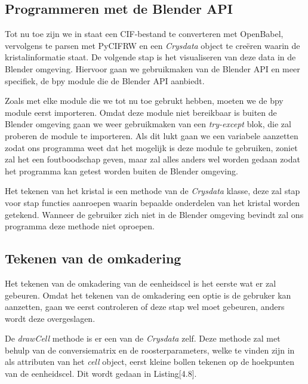 \subsection{Programmeren met de Blender API}
Tot nu toe zijn we in staat een CIF-bestand te converteren met OpenBabel, vervolgens te parsen met PyCIFRW en een \textit{Crysdata} object te creëren waarin de kristalinformatie staat. De volgende stap is het visualiseren van deze data in de Blender omgeving. Hiervoor gaan we gebruikmaken van de Blender API en meer specifiek, de bpy module die de Blender API aanbiedt. 
\par
Zoals met elke module die we tot nu toe gebrukt hebben, moeten we de bpy module eerst importeren. Omdat deze module niet bereikbaar is buiten de Blender omgeving gaan we weer gebruikmaken van een \textit{try-except} blok, die zal proberen de module te importeren. Als dit lukt gaan we een variabele aanzetten zodat ons programma weet dat het mogelijk is deze module te gebruiken, zoniet zal het een foutboodschap geven, maar zal alles anders wel worden gedaan zodat het programma kan getest worden buiten de Blender omgeving.
\par
Het tekenen van het kristal is een methode van de \textit{Crysdata} klasse, deze zal stap voor stap functies aanroepen waarin bepaalde onderdelen van het kristal worden getekend. Wanneer de gebruiker zich niet in de Blender omgeving bevindt zal ons programma deze methode niet oproepen. 

\subsection{Tekenen van de omkadering}

Het tekenen van de omkadering van de eenheidscel is het eerste wat er zal gebeuren. Omdat het tekenen van de omkadering een optie is de gebruker kan aanzetten, gaan we eerst controleren of deze stap wel moet gebeuren, anders wordt deze overgeslagen.
\par
De \textit{drawCell} methode is er een van de \textit{Crysdata} zelf. Deze methode zal met behulp van de conversiematrix en de roosterparameters, welke te vinden zijn in als attributen van het \textit{cell} object, eerst kleine bollen tekenen op de hoekpunten van de eenheidscel. Dit wordt gedaan in Listing[4.8]. 



